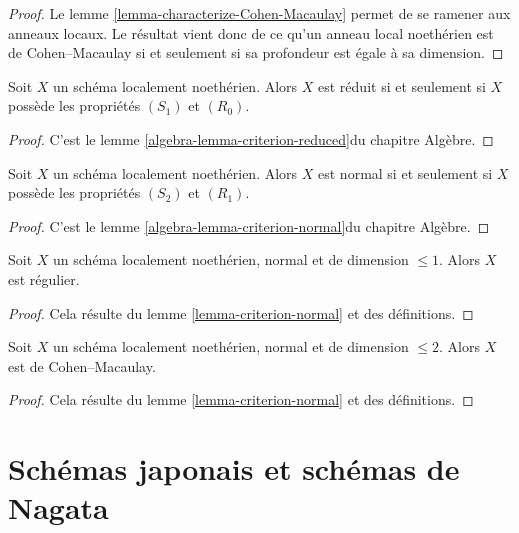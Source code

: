\begin{proof}
Le lemme \ref{lemma-characterize-Cohen-Macaulay}
permet de se ramener aux anneaux locaux.
Le résultat vient donc de ce qu'un anneau local noethérien est de Cohen--Macaulay
si et seulement si sa profondeur est égale à sa dimension.
\end{proof}

\begin{lemma}
\label{lemma-criterion-reduced}
Soit $X$ un schéma localement noethérien.
Alors $X$ est réduit si et seulement si $X$ possède les propriétés $(S_1)$ et $(R_0)$.
\end{lemma}

\begin{proof}
C'est le lemme \ref{algebra-lemma-criterion-reduced}du chapitre Algèbre.
\end{proof}

\begin{lemma}
\label{lemma-criterion-normal}
Soit $X$ un schéma localement noethérien.
Alors $X$ est normal si et seulement si $X$ possède les propriétés $(S_2)$ et $(R_1)$.
\end{lemma}

\begin{proof}
C'est le lemme \ref{algebra-lemma-criterion-normal}du chapitre Algèbre.
\end{proof}

\begin{lemma}
\label{lemma-normal-dimension-1-regular}
Soit $X$ un schéma localement noethérien, normal et
de dimension $\leq 1$. Alors $X$ est régulier.
\end{lemma}

\begin{proof}
Cela résulte du lemme \ref{lemma-criterion-normal} et des définitions.
\end{proof}

\begin{lemma}
\label{lemma-normal-dimension-2-Cohen-Macaulay}
Soit $X$ un schéma localement noethérien, normal et
de dimension $\leq 2$. Alors $X$ est de Cohen--Macaulay.
\end{lemma}

\begin{proof}
Cela résulte du lemme \ref{lemma-criterion-normal} et des définitions.
\end{proof}







\section{Schémas japonais et schémas de Nagata}
\label{section-nagata}

